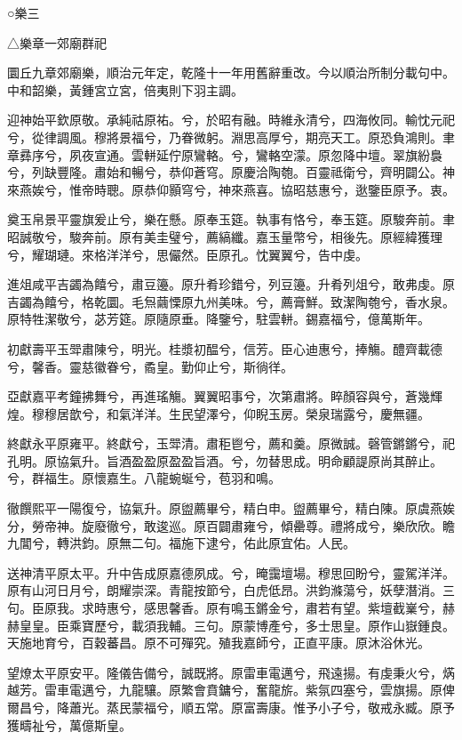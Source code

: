
\begin{pinyinscope}
○樂三

△樂章一郊廟群祀

圜丘九章郊廟樂，順治元年定，乾隆十一年用舊辭重改。今以順治所制分載句中。中和韶樂，黃鍾宮立宮，倍夷則下羽主調。

迎神始平欽原敬。承純祜原祐。兮，於昭有融。時維永清兮，四海攸同。輸忱元祀兮，從律調風。穆將景福兮，乃眷微躬。淵思高厚兮，期亮天工。原恐負鴻則。聿章彞序兮，夙夜宣通。雲軿延佇原鸞輅。兮，鸞輅空濛。原忽降中壇。翠旗紛裊兮，列缺豐隆。肅始和暢兮，恭仰蒼穹。原慶洽陶匏。百靈祗衛兮，齊明闢公。神來燕娭兮，惟帝時聰。原恭仰顥穹兮，神來燕喜。協昭慈惠兮，逖鑒臣原予。衷。

奠玉帛景平靈旗爰止兮，樂在懸。原奉玉筵。執事有恪兮，奉玉筵。原駿奔前。聿昭誠敬兮，駿奔前。原有美圭璧兮，薦縞纖。嘉玉量幣兮，相後先。原經緯獲理兮，耀瑚璉。來格洋洋兮，思儼然。臣原孔。忱翼翼兮，告中虔。

進俎咸平吉蠲為饎兮，肅豆籩。原升肴珍錯兮，列豆籩。升肴列俎兮，敢弗虔。原吉蠲為饎兮，格乾圜。毛炰繭慄原九州美味。兮，薦膏鮮。致潔陶匏兮，香水泉。原特牲潔敬兮，苾芳筵。原隨原垂。降鑒兮，駐雲軿。錫嘉福兮，億萬斯年。

初獻壽平玉斝肅陳兮，明光。桂漿初醖兮，信芳。臣心迪惠兮，捧觴。醴齊載德兮，馨香。靈慈徽眷兮，矞皇。勤仰止兮，斯徜徉。

亞獻嘉平考鐘拂舞兮，再進瑤觴。翼翼昭事兮，次第肅將。睟顏容與兮，蒼幾輝煌。穆穆居歆兮，和氣洋洋。生民望澤兮，仰睨玉房。榮泉瑞露兮，慶無疆。

終獻永平原雍平。終獻兮，玉斝清。肅秬鬯兮，薦和羹。原微誠。磬管鏘鏘兮，祀孔明。原協氣升。旨酒盈盈原盈盈旨酒。兮，勿替思成。明命顧諟原尚其醉止。兮，群福生。原懷嘉生。八龍蜿蜒兮，苞羽和鳴。

徹饌熙平一陽復兮，協氣升。原盥薦畢兮，精白申。盥薦畢兮，精白陳。原虞燕娭分，勞帝神。旋廢徹兮，敢逡巡。原百闢肅雍兮，傾罍尊。禮將成兮，樂欣欣。瞻九閶兮，轉洪鈞。原無二句。福施下逮兮，佑此原宜佑。人民。

送神清平原太平。升中告成原嘉德夙成。兮，晻靄壇場。穆思回盼兮，靈駕洋洋。原有山河日月兮，朗耀崇深。青龍按節兮，白虎低昂。洪鈞滌蕩兮，妖孽潛消。三句。臣原我。求時惠兮，感思馨香。原有鳴玉鏘金兮，肅若有望。紫壇截嶪兮，赫赫皇皇。臣乘寶歷兮，載須我輔。三句。原蒙博產兮，多士思皇。原作山嶽鍾良。天施地育兮，百穀蕃昌。原不可殫究。殖我嘉師兮，正直平康。原沐浴休光。

望燎太平原安平。隆儀告備兮，誠既將。原雷車電邁兮，飛遠揚。有虔秉火兮，焫越芳。雷車電邁兮，九龍驤。原繁會賁鏞兮，奮龍旂。紫氛四塞兮，雲旗揚。原俾爾昌兮，降蕭光。蒸民蒙福兮，順五常。原富壽康。惟予小子兮，敬戒永臧。原予獲疇祉兮，萬億斯皇。


\end{pinyinscope}
